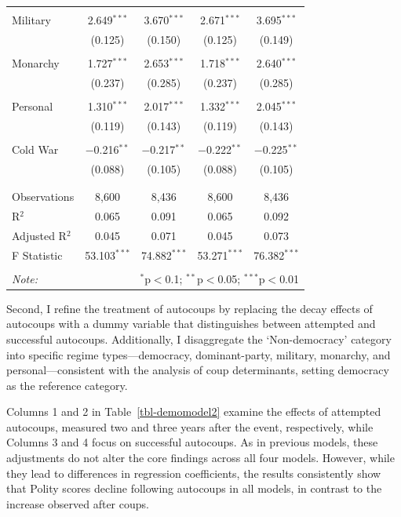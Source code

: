 \documentclass[
  12pt,
]{report}
\begin{document}
\begin{table}
{\begin{tabular}{@{\extracolsep{20pt}}lcccc}
  & & & & \\ 
 \hspace{1.5cm} Military & 2.649$^{***}$ & 3.670$^{***}$ & 2.671$^{***}$ & 3.695$^{***}$ \\ 
  & (0.125) & (0.150) & (0.125) & (0.149) \\ 
  & & & & \\ 
 \hspace{1.5cm} Monarchy & 1.727$^{***}$ & 2.653$^{***}$ & 1.718$^{***}$ & 2.640$^{***}$ \\ 
  & (0.237) & (0.285) & (0.237) & (0.285) \\ 
  & & & & \\ 
 \hspace{1.5cm} Personal & 1.310$^{***}$ & 2.017$^{***}$ & 1.332$^{***}$ & 2.045$^{***}$ \\ 
  & (0.119) & (0.143) & (0.119) & (0.143) \\ 
  & & & & \\ 
 Cold War & $-$0.216$^{**}$ & $-$0.217$^{**}$ & $-$0.222$^{**}$ & $-$0.225$^{**}$ \\ 
  & (0.088) & (0.105) & (0.088) & (0.105) \\ 
  & & & & \\ 
\hline \\[-1.8ex] 
Observations & 8,600 & 8,436 & 8,600 & 8,436 \\ 
R$^{2}$ & 0.065 & 0.091 & 0.065 & 0.092 \\ 
Adjusted R$^{2}$ & 0.045 & 0.071 & 0.045 & 0.073 \\ 
F Statistic & 53.103$^{***}$ & 74.882$^{***}$ & 53.271$^{***}$ & 76.382$^{***}$ \\ 
\hline 
\hline \\[-1.8ex] 
\textit{Note:}  & \multicolumn{4}{r}{$^{*}$p$<$0.1; $^{**}$p$<$0.05; $^{***}$p$<$0.01} \\ 
\end{tabular}

}

\end{table}%

Second, I refine the treatment of autocoups by replacing the decay
effects of autocoups with a dummy variable that distinguishes between
attempted and successful autocoups. Additionally, I disaggregate the
`Non-democracy' category into specific regime types---democracy,
dominant-party, military, monarchy, and personal---consistent with the
analysis of coup determinants, setting democracy as the reference
category.

Columns 1 and 2 in Table~\ref{tbl-demomodel2} examine the effects of
attempted autocoups, measured two and three years after the event,
respectively, while Columns 3 and 4 focus on successful autocoups. As in
previous models, these adjustments do not alter the core findings across
all four models. However, while they lead to differences in regression
coefficients, the results consistently show that Polity scores decline
following autocoups in all models, in contrast to the increase observed
after coups.
\end{document}
